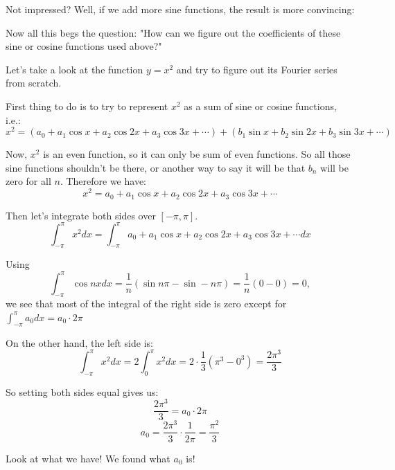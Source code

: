 \documentclass[12pt]{report}
\begin{document}
Not impressed? Well, if we add more sine functions, the result is more convincing:
\begin{center}  \end{center}

Now all this begs the question: "How can we figure out the coefficients of these sine or cosine functions used above?"

Let's take a look at the function $y=x^2$ and try to figure out its Fourier series from scratch.

First thing to do is to try to represent $x^2$ as a sum of sine or cosine functions, i.e.:
$$x^2 = (a_0 + a_1 \cos x + a_2 \cos 2x + a_3 \cos 3x  + \cdots) + (b_1 \sin x + b_2 \sin 2x + b_3 \sin 3x + \cdots)$$

Now, $x^2$ is an even function, so it can only be sum of even functions. So all those sine functions shouldn't be there, or another way to say it will be that $b_n$ will be zero for all $n$. Therefore we have:
$$x^2 = a_0 + a_1 \cos x + a_2 \cos 2x + a_3 \cos 3x  + \cdots $$

Then let's integrate both sides over $[-\pi, \pi]$.
$$\int_{-\pi}^{\pi} x^2 dx = \int_{-\pi}^{\pi} a_0 + a_1 \cos x + a_2 \cos 2x + a_3 \cos 3x  + \cdots  dx $$

Using
$$\int_{-\pi}^{\pi} \cos nx dx = \frac{1}{n} (\sin n \pi - \sin -n \pi) =\frac{1}{n} (0-0) = 0,$$
we see that most of the integral of the right side is zero except for $\int_{-\pi}^{\pi} a_0 dx = a_0 \cdot 2\pi $

On the other hand, the left side is:
$$\int_{-\pi}^{\pi} x^2 dx = 2 \int_{0}^{\pi} x^2 dx = 2\cdot \frac{1}{3} \left( \pi^3 - 0^3 \right) = \frac{2\pi^3}{3} $$

So setting both sides equal gives us:
$$\frac{2\pi^3}{3} =a_0 \cdot 2\pi$$
$$a_0 = \frac{2\pi^3}{3} \cdot \frac{1}{2\pi} = \frac{\pi^2}{3}$$

Look at what we have! We found what $a_0$ is!
\end{document}
